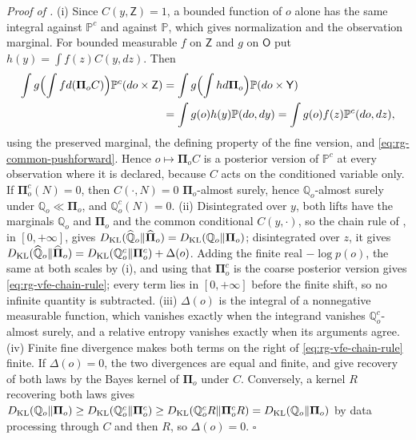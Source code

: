 \noindent\emph{Proof of .}
(i) Since $C(y,\mathsf Z)=1$, a bounded function of $o$ alone has the same integral against
$\mathbb P^c$ and against $\mathbb P$, which gives normalization and the observation marginal. For
bounded measurable $f$ on $\mathsf Z$ and $g$ on $\mathsf O$ put $h(y)=\int f(z)C(y,dz)$. Then
\begin{align*}
\int g\Bigl(\int f d(\boldsymbol\Pi_oC)\Bigr)\mathbb P^c(do\times\mathsf Z)
&=\int g\Bigl(\int h d\boldsymbol\Pi_o\Bigr)\mathbb P(do\times\mathsf Y)\\
&=\int g(o)h(y)\mathbb P(do,dy)
=\int g(o)f(z)\mathbb P^c(do,dz),
\end{align*}
using the preserved marginal, the defining property of the fine version, and
\eqref{eq:rg-common-pushforward}. Hence $o\mapsto\boldsymbol\Pi_oC$ is a posterior version of
$\mathbb P^c$ at every observation where it is declared, because $C$ acts on the conditioned
variable only. If $\boldsymbol\Pi^c_o(N)=0$, then $C(\cdot,N)=0$ $\boldsymbol\Pi_o$-almost surely,
hence $\mathbb Q_o$-almost surely under $\mathbb Q_o\ll\boldsymbol\Pi_o$, and $\mathbb Q^c_o(N)=0$.
(ii) Disintegrated over $y$, both lifts have the marginals $\mathbb Q_o$ and $\boldsymbol\Pi_o$ and
the common conditional $C(y,\cdot)$, so the chain rule of , in
$[0,+\infty]$, gives $D_{\mathrm{KL}}(\widehat{\mathbb Q}_o\Vert\widehat{\boldsymbol\Pi}_o)
=D_{\mathrm{KL}}(\mathbb Q_o\Vert\boldsymbol\Pi_o)$; disintegrated over $z$, it gives
$D_{\mathrm{KL}}(\widehat{\mathbb Q}_o\Vert\widehat{\boldsymbol\Pi}_o)
=D_{\mathrm{KL}}(\mathbb Q^c_o\Vert\boldsymbol\Pi^c_o)+\Delta(o)$. Adding the finite real $-\log p(o)$, the
same at both scales by (i), and using that $\boldsymbol\Pi^c_o$ is the coarse posterior version gives
\eqref{eq:rg-vfe-chain-rule}; every term lies in $[0,+\infty]$ before the finite shift, so no
infinite quantity is subtracted. (iii) $\Delta(o)$ is the integral of a nonnegative measurable
function, which vanishes exactly when the integrand vanishes $\mathbb Q^c_o$-almost surely, and a
relative entropy vanishes exactly when its arguments agree. (iv) Finite fine divergence makes both
terms on the right of \eqref{eq:rg-vfe-chain-rule} finite. If $\Delta(o)=0$, the two divergences
are equal and finite, and  give recovery
of both laws by the Bayes kernel of $\boldsymbol\Pi_o$ under $C$. Conversely, a kernel $R$
recovering both laws gives $D_{\mathrm{KL}}(\mathbb Q_o\Vert\boldsymbol\Pi_o)\geq D_{\mathrm{KL}}(\mathbb Q^c_o\Vert\boldsymbol\Pi^c_o)
\geq D_{\mathrm{KL}}(\mathbb Q^c_oR\Vert\boldsymbol\Pi^c_oR)=D_{\mathrm{KL}}(\mathbb Q_o\Vert\boldsymbol\Pi_o)$ by data
processing through $C$ and then $R$, so $\Delta(o)=0$. $\square$


